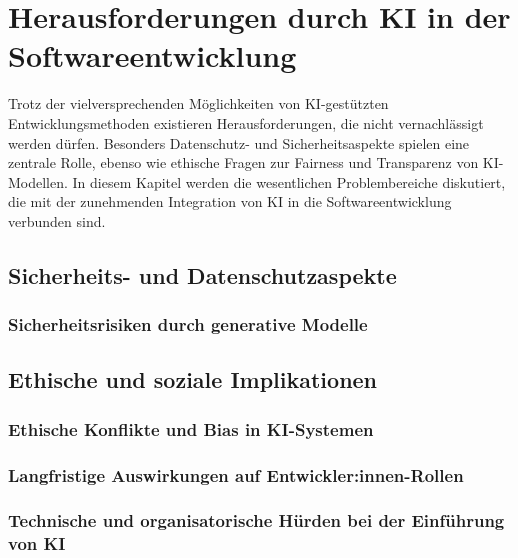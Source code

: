 \chapter{Herausforderungen durch KI in der Softwareentwicklung}
Trotz der vielversprechenden Möglichkeiten von KI-gestützten Entwicklungsmethoden existieren Herausforderungen, die nicht vernachlässigt werden dürfen. Besonders Datenschutz- und Sicherheitsaspekte spielen eine zentrale Rolle, ebenso wie ethische Fragen zur Fairness und Transparenz von KI-Modellen. In diesem Kapitel werden die wesentlichen Problembereiche diskutiert, die mit der zunehmenden Integration von KI in die Softwareentwicklung verbunden sind. 
\section{Sicherheits- und Datenschutzaspekte}


\subsection{Sicherheitsrisiken durch generative Modelle}


\section{Ethische und soziale Implikationen}


\subsection{Ethische Konflikte und Bias in KI-Systemen}


\subsection{Langfristige Auswirkungen auf Entwickler:innen-Rollen}


\subsection{Technische und organisatorische Hürden bei der Einführung von KI}
 
